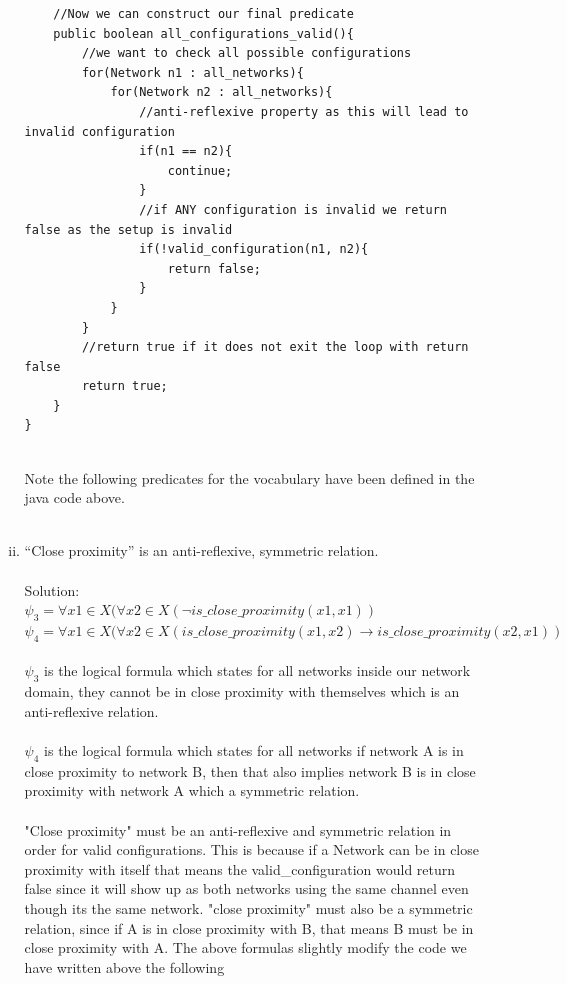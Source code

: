 \documentclass{article}
\newcommand*\moveToRight[1]{\hspace*{0em plus 1fill}\makebox{(#1)}}
\begin{document}
\begin{enumerate}[(a)]
\begin{enumerate}[(i)]
\begin{lstlisting}
    //Now we can construct our final predicate
    public boolean all_configurations_valid(){
        //we want to check all possible configurations
        for(Network n1 : all_networks){
            for(Network n2 : all_networks){
                //anti-reflexive property as this will lead to invalid configuration
                if(n1 == n2){
                    continue;
                }
                //if ANY configuration is invalid we return false as the setup is invalid
                if(!valid_configuration(n1, n2){
                    return false;
                }
            }
        }
        //return true if it does not exit the loop with return false
        return true;
    }
}
                \end{lstlisting}\\
            Note the following predicates for the vocabulary have been defined in the java code above.\\\\
            \item “Close proximity” is an anti-reflexive, symmetric relation. \moveToRight{2 marks}\\\\
            Solution: \\
            $\psi_3 = \forall x1 \in X(\forall x2 \in X(\neg is\_close\_proximity(x1,x1))$\\
            $\psi_4 = \forall x1 \in X(\forall x2 \in X(is\_close\_proximity(x1,x2) \to is\_close\_proximity(x2,x1))$\\\\
            $\psi_3$ is the logical formula which states for all networks inside our network domain, they cannot be in close proximity with themselves which is an anti-reflexive relation.\\\\
            $\psi_4$ is the logical formula which states for all networks if network A is in close proximity to network B, then that also implies network B is in close proximity with network A which a symmetric relation.\\\\
            "Close proximity" must be an anti-reflexive and symmetric relation in order for valid configurations. This is because if a Network can be in close proximity with itself that means the valid\_configuration would return false since it will show up as both networks using the same channel even though its the same network. "close proximity" must also be a symmetric relation, since if A is in close proximity with B, that means B must be in close proximity with A. The above formulas slightly modify the code we have written above the following\\

\end{enumerate}
\end{enumerate}
\end{document}
